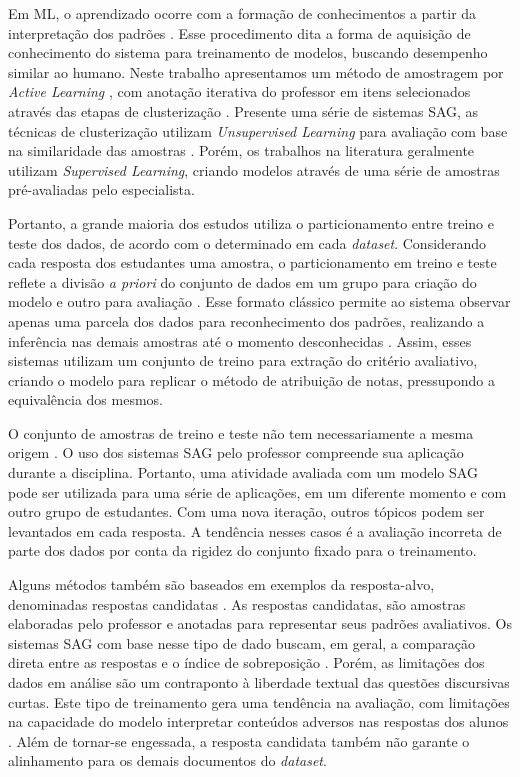 Em ML, o aprendizado ocorre com a formação de conhecimentos a partir da interpretação dos padrões \cite{bishop2006}. Esse procedimento dita a forma de aquisição de conhecimento do sistema para treinamento de modelos, buscando desempenho similar ao humano. Neste trabalho apresentamos um método de amostragem por \textit{Active Learning} \cite{miller2020, kumar2020}, com anotação iterativa do professor em itens selecionados através das etapas de clusterização \cite{horbach2018}. Presente uma série de sistemas SAG, as técnicas de clusterização utilizam \textit{Unsupervised Learning} para avaliação com base na similaridade das amostras \cite{basu2013, zhang2016, marvaniya2018}. Porém, os trabalhos na literatura geralmente utilizam \textit{Supervised Learning}, criando modelos através de uma série de amostras pré-avaliadas pelo especialista.

Portanto, a grande maioria dos estudos utiliza o particionamento entre treino e teste dos dados, de acordo com o determinado em cada \textit{dataset}. Considerando cada resposta dos estudantes uma amostra, o particionamento em treino e teste reflete a divisão \textit{a priori} do conjunto de dados em um grupo para criação do modelo e outro para avaliação \cite{heilman2015}. Esse formato clássico permite ao sistema observar apenas uma parcela dos dados para reconhecimento dos padrões, realizando a inferência nas demais amostras até o momento desconhecidas \cite{bishop2006}. Assim, esses sistemas utilizam um conjunto de treino para extração do critério avaliativo, criando o modelo para replicar o método de atribuição de notas, pressupondo a equivalência dos mesmos.

O conjunto de amostras de treino e teste não tem necessariamente a mesma origem \cite{sung2019a}. O uso dos sistemas SAG pelo professor compreende sua aplicação durante a disciplina. Portanto, uma atividade avaliada com um modelo SAG pode ser utilizada para uma série de aplicações, em um diferente momento e com outro grupo de estudantes. Com uma nova iteração, outros tópicos podem ser levantados em cada resposta. A tendência nesses casos é a avaliação incorreta de parte dos dados por conta da rigidez do conjunto fixado para o treinamento.

Alguns métodos também são baseados em exemplos da resposta-alvo, denominadas respostas candidatas \cite{banjade2015, roy2016}. As respostas candidatas, são amostras elaboradas pelo professor e anotadas para representar seus padrões avaliativos. Os sistemas SAG com base nesse tipo de dado buscam, em geral, a comparação direta entre as respostas e o índice de sobreposição \cite{jimenez2013, kar2017, zhang2020}. Porém, as limitações dos dados em análise são um contraponto à liberdade textual das questões discursivas curtas. Este tipo de treinamento gera uma tendência na avaliação, com limitações na capacidade do modelo interpretar conteúdos adversos nas respostas dos alunos \cite{ramachandran2015a}. Além de tornar-se engessada, a resposta candidata também não garante o alinhamento para os demais documentos do \textit{dataset}.

